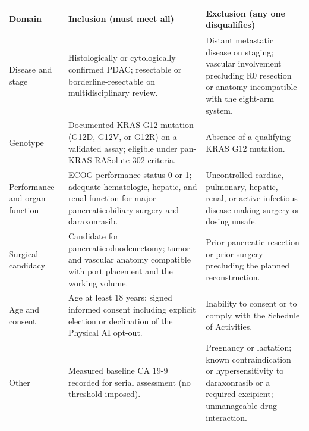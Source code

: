 \noindent\begin{tabularx}{\textwidth}{L{3.0cm} Y Y}
\toprule
\textbf{Domain} & \textbf{Inclusion (must meet all)} & \textbf{Exclusion (any one disqualifies)} \\
\midrule
Disease and stage & Histologically or cytologically confirmed PDAC; resectable or borderline-resectable on multidisciplinary review. & Distant metastatic disease on staging; vascular involvement precluding R0 resection or anatomy incompatible with the eight-arm system. \\
\addlinespace
Genotype & Documented KRAS G12 mutation (G12D, G12V, or G12R) on a validated assay; eligible under pan-KRAS RASolute 302 criteria. & Absence of a qualifying KRAS G12 mutation. \\
\addlinespace
Performance and organ function & ECOG performance status 0 or 1; adequate hematologic, hepatic, and renal function for major pancreaticobiliary surgery and daraxonrasib. & Uncontrolled cardiac, pulmonary, hepatic, renal, or active infectious disease making surgery or dosing unsafe. \\
\addlinespace
Surgical candidacy & Candidate for pancreaticoduodenectomy; tumor and vascular anatomy compatible with port placement and the working volume. & Prior pancreatic resection or prior surgery precluding the planned reconstruction. \\
\addlinespace
Age and consent & Age at least 18 years; signed informed consent including explicit election or declination of the Physical AI opt-out. & Inability to consent or to comply with the Schedule of Activities. \\
\addlinespace
Other & Measured baseline CA 19-9 recorded for serial assessment (no threshold imposed). & Pregnancy or lactation; known contraindication or hypersensitivity to daraxonrasib or a required excipient; unmanageable drug interaction. \\
\bottomrule
\end{tabularx}
\vspace*{-0.25cm}

